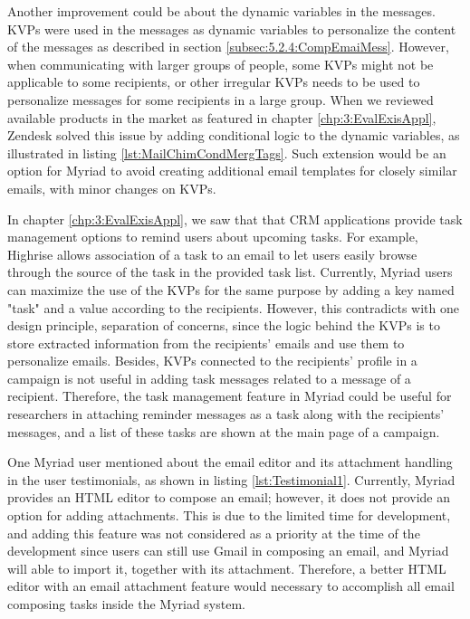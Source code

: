 Another improvement could be about the dynamic variables in the messages. \ac{KVP}s were used in the messages as dynamic variables to personalize the content of the messages as described in section \ref{subsec:5.2.4:CompEmaiMess}. However, when communicating with larger groups of people, some \ac{KVP}s might not be applicable to some recipients, or other irregular \ac{KVP}s needs to be used to personalize messages for some recipients in a large group. When we reviewed available products in the market as featured in chapter \ref{chp:3:EvalExisAppl}, Zendesk solved this issue by adding conditional logic to the dynamic variables, as illustrated in listing \ref{lst:MailChimCondMergTags}. Such extension would be an option for Myriad to avoid creating additional email templates for closely similar emails, with minor changes on \ac{KVP}s.
\vspace{1cm}

In chapter \ref{chp:3:EvalExisAppl}, we saw that that \ac{CRM} applications provide task management options to remind users about upcoming tasks. For example, Highrise allows association of a task to an email to let users easily browse through the source of the task in the provided task list. Currently, Myriad users can maximize the use of the \ac{KVP}s for the same purpose by adding a key named "task" and a value according to the recipients. However, this contradicts with one design principle, separation of concerns, since the logic behind the \ac{KVP}s is to store extracted information from the recipients' emails and use them to personalize emails. Besides, \ac{KVP}s connected to the recipients' profile in a campaign is not useful in adding task messages related to a message of a recipient. Therefore, the task management feature in Myriad could be useful for researchers in attaching reminder messages as a task along with the recipients' messages, and a list of these tasks are shown at the main page of a campaign.
\vspace{1cm}

One Myriad user mentioned about the email editor and its attachment handling in the user testimonials, as shown in listing \ref{lst:Testimonial1}. Currently, Myriad provides an \ac{HTML} editor to compose an email; however, it does not provide an option for adding attachments. This is due to the limited time for development, and adding this feature was not considered as a priority at the time of the development since users can still use Gmail in composing an email, and Myriad will able to import it, together with its attachment. Therefore, a better \ac{HTML} editor with an email attachment feature would necessary to accomplish all email composing tasks inside the Myriad system.
\vspace{1cm}


